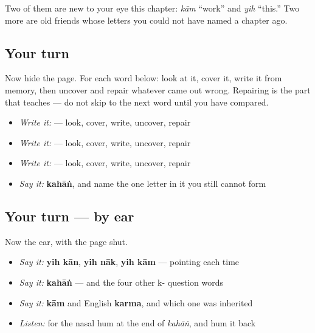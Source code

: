 \begin{quote}
\end{quote}

\begin{quote}
\end{quote}

\begin{quote}
\end{quote}

\begin{quote}
\end{quote}

Two of them are new to your eye this chapter: \textbf{} \emph{kām} \textquotedblleft{}work\textquotedblright{} and \textbf{} \emph{yih} \textquotedblleft{}this.\textquotedblright{} Two more are old friends whose letters you could not have named a chapter ago.

\subsection*{Your turn}
Now hide the page. For each word below: look at it, cover it, write it from memory, then uncover and repair whatever came out wrong. Repairing is the part that teaches — do not skip to the next word until you have compared.

\begin{itemize}
\raggedright
  \item \emph{Write it:}  — look, cover, write, uncover, repair
  \item \emph{Write it:}  — look, cover, write, uncover, repair
  \item \emph{Write it:}  — look, cover, write, uncover, repair
  \item \emph{Say it:} \textbf{kahāṅ}, and name the one letter in it you still cannot form
\end{itemize}

\subsection*{Your turn — by ear}
Now the ear, with the page shut.

\begin{itemize}
\raggedright
  \item \emph{Say it:} \textbf{yih kān}, \textbf{yih nāk}, \textbf{yih kām} — pointing each time
  \item \emph{Say it:} \textbf{kahāṅ} — and the four other k- question words
  \item \emph{Say it:} \textbf{kām} and English \textbf{karma}, and which one was inherited
  \item \emph{Listen:} for the nasal hum at the end of \emph{kahāṅ}, and hum it back
\end{itemize}

